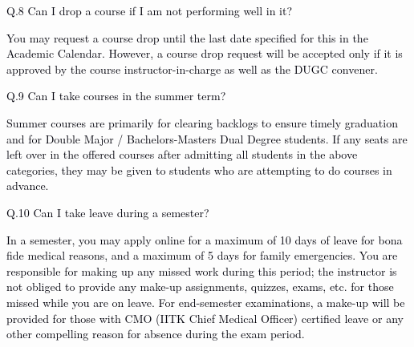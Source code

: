 \documentclass[12pt]{article}
\begin{document}
\vspace{\baselineskip}
{\fontsize{10pt}{12.0pt}\selectfont \textcolor[HTML]{00000A}{Q.8 Can I drop a course if I am not performing well in it?}\par}\par


\vspace{\baselineskip}
\begin{justify}
{\fontsize{9pt}{10.8pt}\selectfont \textcolor[HTML]{00000A}{You may request a course drop until the last date specified for this in the Academic Calendar. However, a course drop request will be accepted only if it is approved by the course instructor-in-charge as well as the DUGC convener.}\par}
\end{justify}\par


\vspace{\baselineskip}
{\fontsize{10pt}{12.0pt}\selectfont \textcolor[HTML]{00000A}{Q.9 Can I take courses in the summer term?}\par}\par


\vspace{\baselineskip}
\begin{justify}
{\fontsize{10pt}{12.0pt}\selectfont \textcolor[HTML]{00000A}{Summer courses are primarily for clearing backlogs to ensure timely graduation and for Double Major / Bachelors-Masters Dual Degree students. If any seats are left over in the offered courses after admitting all students in the above categories, they may be given to students who are attempting to do courses in advance.}\par}
\end{justify}\par


\vspace{\baselineskip}
{\fontsize{10pt}{12.0pt}\selectfont \textcolor[HTML]{00000A}{Q.10 Can I take leave during a semester?}\par}\par


\vspace{\baselineskip}
\begin{justify}
{\fontsize{10pt}{12.0pt}\selectfont \textcolor[HTML]{00000A}{In a semester, you may apply online for a maximum of 10 days of leave for bona fide medical reasons, and a maximum of 5 days for family emergencies. You are responsible for making up any missed work during this period; the instructor is not obliged to provide any make-up assignments, quizzes, exams, etc. for those missed while you are on leave. For end-semester examinations, a make-up will be provided for those with CMO (IITK Chief Medical Officer) certified leave or any other compelling reason for absence during the exam period.}\par}
\end{justify}\par
\end{document}
